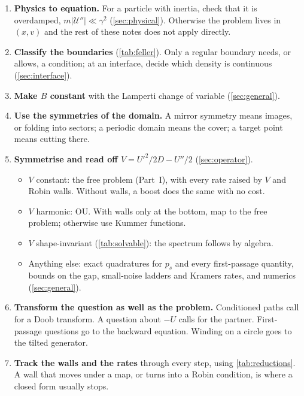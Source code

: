 \documentclass[11pt]{article}
\numberwithin{equation}{section}
\begin{document}
\begin{enumerate}
  \item \textbf{Physics to equation.} For a particle with inertia, check that it is overdamped, $m|\mathcal U''|\ll\gamma^2$
        (\cref{sec:physical}). Otherwise the problem lives in $(x,v)$ and the rest of these notes does not apply
        directly.
  \item \textbf{Classify the boundaries} (\cref{tab:feller}). Only a regular boundary needs, or allows, a condition;
        at an interface, decide which density is continuous (\cref{sec:interface}).
  \item \textbf{Make $B$ constant} with the Lamperti change of variable (\cref{sec:general}).
  \item \textbf{Use the symmetries of the domain.} A mirror symmetry means images, or folding into sectors; a
        periodic domain means the cover; a target point means cutting there.
  \item \textbf{Symmetrise and read off $V=U'^2/2D-U''/2$} (\cref{sec:operator}).
        \begin{itemize}
          \item $V$ constant: the free problem (Part~I), with every rate raised by $V$ and Robin walls. Without walls,
                a boost does the same with no cost.
          \item $V$ harmonic: OU. With walls only at the bottom, map to the free problem; otherwise use Kummer
                functions.
          \item $V$ shape-invariant (\cref{tab:solvable}): the spectrum follows by algebra.
          \item Anything else: exact quadratures for $p_s$ and every first-passage quantity, bounds on the gap,
                small-noise ladders and Kramers rates, and numerics (\cref{sec:general}).
        \end{itemize}
  \item \textbf{Transform the question as well as the problem.} Conditioned paths call for a Doob transform. A
        question about $-U$ calls for the partner. First-passage questions go to the backward equation. Winding
        on a circle goes to the tilted generator.
  \item \textbf{Track the walls and the rates} through every step, using \cref{tab:reductions}. A wall that moves
        under a map, or turns into a Robin condition, is where a closed form usually stops.
\end{enumerate}
\end{document}
